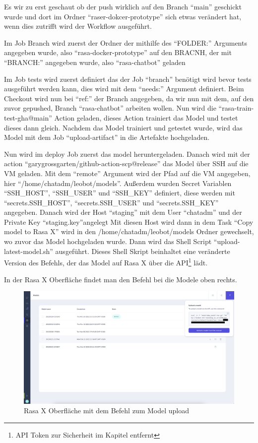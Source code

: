 Es wir zu erst geschaut ob der push wirklich auf den Branch ``main'' geschickt wurde und dort im Ordner ``raser-dokcer-prototype'' sich etwas verändert hat, wenn dies zutrifft wird der Workflow ausgeführt.

Im Job Branch wird zuerst der Ordner der mithilfe des ``FOLDER:'' Arguments angegeben wurde, also ``rasa-docker-prototype'' auf den BRACNH, der mit ``BRANCH:'' angegeben wurde, also ``rasa-chatbot'' geladen

Im Job tests wird zuerst definiert das der Job ``branch'' benötigt wird bevor tests ausgeführt werden kann, dies wird mit dem ``needs:'' Argument definiert.
Beim Checkout wird nun bei ``ref:'' der Branch angegeben, da wir nun mit dem, auf den zuvor gepushed, Branch ``rasa-chatbot'' arbeiten wollen.
Nun wird die ``rasa-train-test-gha@main'' Action geladen, dieses Action trainiert das Model und testet dieses dann gleich.
Nachdem das Model trainiert und getestet wurde, wird das Model mit dem Job ``upload-artifact'' in die Artefakte hochgeladen.

Nun wird im deploy Job zuerst das model heruntergeladen.
Danach wird mit der action ``garygrossgarten/github-action-scp@release'' das Model über SSH auf die VM geladen.
Mit dem ``remote'' Argument wird der Pfad auf die VM angegeben, hier ``/home/chatadm/leobot/models''.
Außerdem wurden Secret Variablen ``SSH\_HOST'', ``SSH\_USER'' und ``SSH\_KEY'' definiert, diese werden mit ``secrets.SSH\_HOST'', ``secrets.SSH\_USER'' und ``secrets.SSH\_KEY'' angegeben.
Danach wird der Host ``staging'' mit dem User ``chatadm'' und der Private Key ``staging.key''angelegt
Mit diesen Host wird dann in dem Task ``Copy model to Rasa X'' wird in den /home/chatadm/leobot/models Ordner gewechselt, wo zuvor das Model hochgeladen wurde.
Dann wird das Shell Script ``upload-latest-model.sh'' ausgeführt.
Dieses Shell Skript beinhaltet eine veränderte Version des Befehls, der das Model auf Rasa X über die API\footnote{API Token zur Sicherheit im Kapitel entfernt} lädt.

In der Rasa X Oberfläche findet man den Befehl bei die Modele oben rechts.

\begin{figure}[hbt!]
    \centering
    \includegraphics[scale=0.2]{pics/rasaxapimodel}
    \caption{Rasa X Oberfläche mit dem Befehl zum Model upload}
    \label{fig:impl:rasaxapimodel}
\end{figure}

